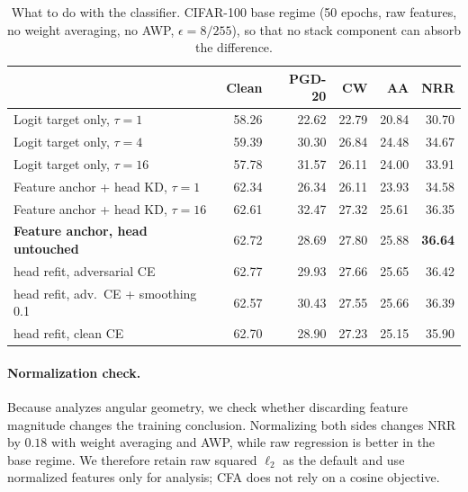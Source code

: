 \begin{table}[!htbp]
  \centering \small \setlength{\tabcolsep}{4.5pt}
  \caption{What to do with the classifier. CIFAR-100 base regime (50 epochs, raw features, no weight
  averaging, no AWP, $\epsilon=8/255$), so that no stack component can absorb the difference.}
  \label{tab:ablation}
  \begin{tabular}{lrrrrr}
    \toprule
    & Clean & PGD-20 & CW & AA & NRR \\
    \midrule
    Logit target only, $\tau=1$               & 58.26 & 22.62 & 22.79 & 20.84 & 30.70 \\
    Logit target only, $\tau=4$               & 59.39 & 30.30 & 26.84 & 24.48 & 34.67 \\
    Logit target only, $\tau=16$              & 57.78 & 31.57 & 26.11 & 24.00 & 33.91 \\
    Feature anchor + head KD, $\tau=1$        & 62.34 & 26.34 & 26.11 & 23.93 & 34.58 \\
    Feature anchor + head KD, $\tau=16$       & 62.61 & 32.47 & 27.32 & 25.61 & 36.35 \\
    \textbf{Feature anchor, head untouched}   & 62.72 & 28.69 & 27.80 & 25.88 & \textbf{36.64} \\
    \quad head refit, adversarial CE          & 62.77 & 29.93 & 27.66 & 25.65 & 36.42 \\
    \quad head refit, adv.\ CE + smoothing 0.1& 62.57 & 30.43 & 27.55 & 25.66 & 36.39 \\
    \quad head refit, clean CE                & 62.70 & 28.90 & 27.23 & 25.15 & 35.90 \\
    \bottomrule
  \end{tabular}
\end{table}

\paragraph{Normalization check.} Because  analyzes angular geometry, we
check whether discarding feature magnitude changes the training conclusion. Normalizing both sides
changes NRR by $0.18$ with weight averaging and AWP, while raw regression is better in the base
regime. We therefore retain raw squared $\ell_2$ as the default and use normalized features only for
analysis; CFA does not rely on a cosine objective.

